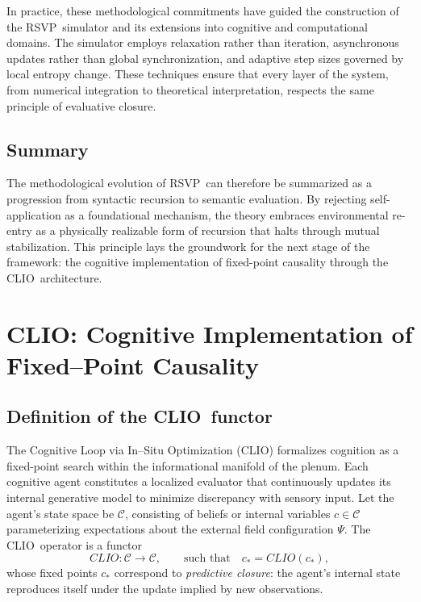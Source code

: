 \documentclass[12pt,a4paper]{article}
\newcommand{\RSVP}{RSVP}              %
\newcommand{\CLIO}{CLIO}              %
\newcommand{\State}{\Psi}             %
\theoremstyle{plain}
\begin{document}
In practice, these methodological commitments have guided the construction of the \RSVP\ simulator and its extensions into cognitive and computational domains.
The simulator employs relaxation rather than iteration, asynchronous updates rather than global synchronization, and adaptive step sizes governed by local entropy change.
These techniques ensure that every layer of the system, from numerical integration to theoretical interpretation, respects the same principle of evaluative closure.

\subsection{Summary}
The methodological evolution of \RSVP\ can therefore be summarized as a progression from syntactic recursion to semantic evaluation.
By rejecting self-application as a foundational mechanism, the theory embraces environmental re-entry as a physically realizable form of recursion that halts through mutual stabilization.
This principle lays the groundwork for the next stage of the framework: the cognitive implementation of fixed-point causality through the \CLIO\ architecture.



\section{\CLIO: Cognitive Implementation of Fixed--Point Causality}
\label{sec:clio}

\subsection{Definition of the \CLIO\ functor}
The Cognitive Loop via In--Situ Optimization (\CLIO) formalizes cognition as a fixed-point search within the informational manifold of the plenum.  
Each cognitive agent constitutes a localized evaluator that continuously updates its internal generative model to minimize discrepancy with sensory input.  
Let the agent’s state space be \(\mathcal{C}\), consisting of beliefs or internal variables \(c \in \mathcal{C}\) parameterizing expectations about the external field configuration \(\State\).  
The \CLIO\ operator is a functor
\begin{equation}
\CLIO: \mathcal{C} \longrightarrow \mathcal{C},
\qquad
\text{such that}\quad
c_* = \CLIO(c_*) ,
\end{equation}
whose fixed points \(c_*\) correspond to \emph{predictive closure}: the agent’s internal state reproduces itself under the update implied by new observations.  
\end{document}
